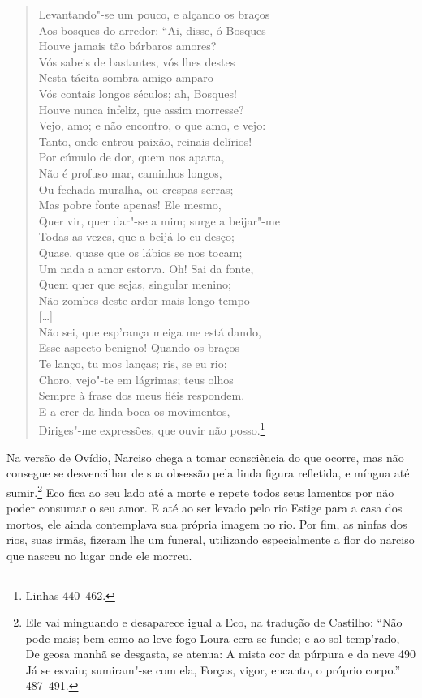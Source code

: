 \begin{verse}
Levantando"-se um pouco, e alçando os braços\\
Aos bosques do arredor: “Ai, disse, ó Bosques\\
Houve jamais tão bárbaros amores?\\
Vós sabeis de bastantes, vós lhes destes\\
Nesta tácita sombra amigo amparo\\
Vós contais longos séculos; ah, Bosques!\\
Houve nunca infeliz, que assim morresse?\\
Vejo, amo; e não encontro, o que amo, e vejo:\\
Tanto, onde entrou paixão, reinais delírios!\\
Por cúmulo de dor, quem nos aparta,\\
Não é profuso mar, caminhos longos,\\
Ou fechada muralha, ou crespas serras;\\
Mas pobre fonte apenas! Ele mesmo,\\
Quer vir, quer dar"-se a mim; surge a beijar"-me\\
Todas as vezes, que a beijá-lo eu desço;\\
Quase, quase que os lábios se nos tocam;\\
Um nada a amor estorva. Oh! Sai da fonte,\\
Quem quer que sejas, singular menino;\\
Não zombes deste ardor mais longo tempo\\
\mbox{}[\ldots{}]\\
Não sei, que esp'rança meiga me está dando,\\
Esse aspecto benigno! Quando os braços\\
Te lanço, tu mos lanças; ris, se eu rio;\\
Choro, vejo"-te em lágrimas; teus olhos \\
Sempre à frase dos meus fiéis respondem.\\
E a crer da linda boca os movimentos,\\
Diriges"-me expressões, que ouvir não posso.\footnote{ Linhas
440--462.}
\end{verse}

Na versão de Ovídio, Narciso chega a tomar consciência do que ocorre,
mas não consegue se desvencilhar de sua obsessão pela linda figura
refletida, e míngua até sumir.\footnote{ Ele vai minguando e
desaparece igual a Eco, na tradução de Castilho: “Não pode mais; bem
como ao leve fogo Loura cera se funde; e ao sol temp'rado, De geosa
manhã se desgasta, se atenua: A mista cor da púrpura e da neve 490 Já
se esvaiu; sumiram"-se com ela, Forças, vigor, encanto, o próprio
corpo.” 487--491.} Eco fica ao seu lado até a morte e repete todos
seus lamentos por não poder consumar o seu amor. E até ao ser levado
pelo rio Estige para a casa dos mortos, ele ainda contemplava sua
própria imagem no rio. Por fim, as ninfas dos rios, suas irmãs,
fizeram lhe um funeral, utilizando especialmente a flor do narciso
que nasceu no lugar onde ele morreu.


